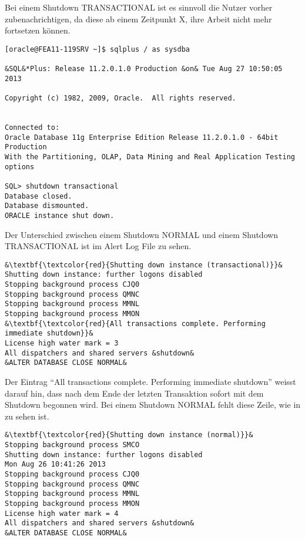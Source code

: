         \begin{merke}
          Bei einem Shutdown TRANSACTIONAL ist es sinnvoll die Nutzer vorher zubenachrichtigen, da diese ab einem Zeitpunkt X, ihre Arbeit nicht mehr fortsetzen können.
        \end{merke}
        \begin{lstlisting}[caption={Durchführen eines Shutdown
        TRANSACTIONAL},label=admin09,language=sqlplus]
[oracle@FEA11-119SRV ~]$ sqlplus / as sysdba

&SQL&*Plus: Release 11.2.0.1.0 Production &on& Tue Aug 27 10:50:05 2013

Copyright (c) 1982, 2009, Oracle.  All rights reserved.


Connected to:
Oracle Database 11g Enterprise Edition Release 11.2.0.1.0 - 64bit Production
With the Partitioning, OLAP, Data Mining and Real Application Testing options

SQL> shutdown transactional
Database closed.
Database dismounted.
ORACLE instance shut down.
        \end{lstlisting}
\clearpage		
        Der Unterschied zwischen einem Shutdown NORMAL und einem Shutdown TRANSACTIONAL ist im Alert Log File zu sehen.
        \begin{lstlisting}[caption={Der Shutdown TRANSACTIONAL im Alert
        Log},label=admin10,language=terminal]
&\textbf{\textcolor{red}{Shutting down instance (transactional)}}&
Shutting down instance: further logons disabled
Stopping background process CJQ0
Stopping background process QMNC
Stopping background process MMNL
Stopping background process MMON
&\textbf{\textcolor{red}{All transactions complete. Performing immediate shutdown}}&
License high water mark = 3
All dispatchers and shared servers &shutdown&
&ALTER DATABASE CLOSE NORMAL&
        \end{lstlisting}
        Der Eintrag \enquote{All transactions complete. Performing immediate shutdown} weisst darauf hin, dass nach dem Ende der letzten Transaktion sofort mit dem Shutdown begonnen wird. Bei einem Shutdown NORMAL fehlt diese Zeile, wie in  zu sehen ist.
        \begin{lstlisting}[caption={Der Shutdown NORMAL im Alert Log},label=admin11,language=terminal]
&\textbf{\textcolor{red}{Shutting down instance (normal)}}&
Stopping background process SMCO
Shutting down instance: further logons disabled
Mon Aug 26 10:41:26 2013
Stopping background process CJQ0
Stopping background process QMNC
Stopping background process MMNL
Stopping background process MMON
License high water mark = 4
All dispatchers and shared servers &shutdown&
&ALTER DATABASE CLOSE NORMAL&
       \end{lstlisting}

